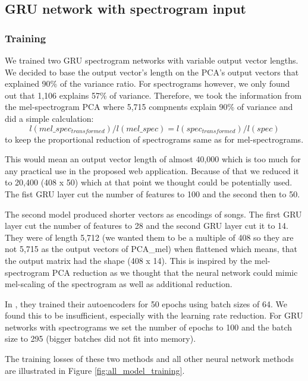 \subsection{GRU network with spectrogram input}\label{ssec:GRU_spec_experiments}

\subsubsection{Training}

We trained two GRU spectrogram networks with variable output vector lengths. We decided to base the output vector's length on the PCA's output vectors that explained 90\% of the variance ratio. For spectrograms however, we only found out that 1,106 explains 57\% of variance. Therefore, we took the information from the mel-spectrogram PCA where 5,715 compnents explain 90\% of variance and did a simple calculation: $$ l(mel\_spec_{transformed})/l(mel\_spec) = l(spec_{transformed})/l(spec) $$ to keep the proportional reduction of spectrograms same as for mel-spectrograms. 

This would mean an output vector length of almost 40,000 which is too much for any practical use in the proposed web application. Because of that we reduced it to 20,400 (408 x 50) which at that point we thought could be potentially used. The fist GRU layer cut the number of features to 100 and the second then to 50.

The second model produced shorter vectors as encodings of songs. The first GRU layer cut the number of features to 28 and the second GRU layer cut it to 14. They were of length 5,712 (we wanted them to be a multiple of 408 so they are not 5,715 as the output vectors of PCA\_mel) when flattened which means, that the output matrix had the shape (408 x 14). This is inspired by the mel-spectrogram PCA reduction as we thought that the neural network could mimic mel-scaling of the spectrogram as well as additional reduction. 

In \cite{inproceedings_RNNs}, they trained their autoencoders for 50 epochs using batch sizes of 64. We found this to be insufficient, especially with the learning rate reduction. For GRU networks with spectrograms we set the number of epochs to 100 and the batch size to 295 (bigger batches did not fit into memory). 

The training losses of these two methods and all other neural network methods are illustrated in Figure \ref{fig:all_model_training}. 

